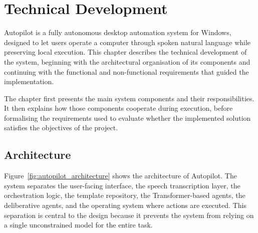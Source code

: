 \chapter{Technical Development}
\setcounter{section}{0}

Autopilot is a fully autonomous desktop automation system for Windows, designed to let users operate a computer through spoken natural language while preserving local execution. This chapter describes the technical development of the system, beginning with the architectural organisation of its components and continuing with the functional and non-functional requirements that guided the implementation.

The chapter first presents the main system components and their responsibilities. It then explains how those components cooperate during execution, before formalising the requirements used to evaluate whether the implemented solution satisfies the objectives of the project.

\section{Architecture}
\label{sec:system-architecture}
\label{sec:system-design}


Figure~\ref{fig:autopilot_architecture} shows the architecture of Autopilot. The system separates the user-facing interface, the speech transcription layer, the orchestration logic, the template repository, the Transformer-based agents, the deliberative agents, and the operating system where actions are executed. This separation is central to the design because it prevents the system from relying on a single unconstrained model for the entire task.

